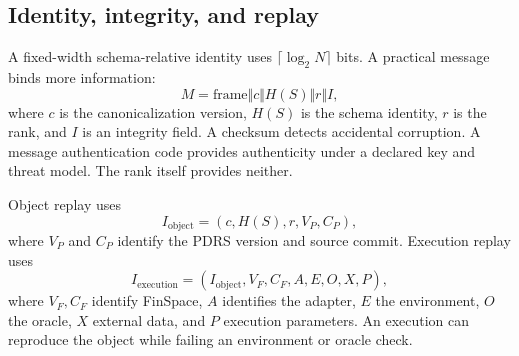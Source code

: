 \subsection{Identity, integrity, and replay}
A fixed-width schema-relative identity uses \(\lceil\log_2N\rceil\) bits. A practical message binds more information:
\begin{equation}
M=\text{frame}\Vert c\Vert H(S)\Vert r\Vert I,
\end{equation}
where \(c\) is the canonicalization version, \(H(S)\) is the schema identity, \(r\) is the rank, and \(I\) is an integrity field. A checksum detects accidental corruption. A message authentication code provides authenticity under a declared key and threat model. The rank itself provides neither.

Object replay uses
\begin{equation}
I_{\mathrm{object}}=(c,H(S),r,V_P,C_P),
\end{equation}
where \(V_P\) and \(C_P\) identify the PDRS version and source commit. Execution replay uses
\begin{equation}
I_{\mathrm{execution}}=(I_{\mathrm{object}},V_F,C_F,A,E,O,X,P),
\end{equation}
where \(V_F,C_F\) identify FinSpace, \(A\) identifies the adapter, \(E\) the environment, \(O\) the oracle, \(X\) external data, and \(P\) execution parameters. An execution can reproduce the object while failing an environment or oracle check.
